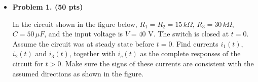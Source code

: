 \begin{itemize}

\item {\bf Problem 1. (50 pts)}

In the circuit shown in the figure below, $R_1=R_2=15\,k\Omega$, $R_3=30\,k\Omega$,
$C=50\,\mu F$, and the input voltage is $V=40$ V. The switch is closed at $t=0$.
Assume the circuit was at steady state before $t=0$. Find currents $i_1(t)$, $i_2(t)$
and $i_3(t)$, together with $i_c(t)$ as the complete responses of the circuit for $t>0$.
Make sure the signs of these currents are consistent with the assumed directions as 
shown in the figure.


%
%
%


\end{itemize}
